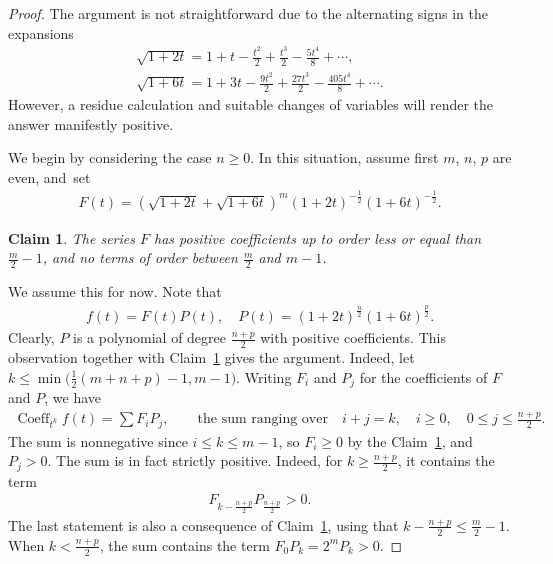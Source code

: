 \documentclass[10pt,a4paper]{amsart}
\numberwithin{equation}{section}
\newtheorem{Claim}[Theorem]{Claim}
\begin{document}
\begin{proof}
The argument is not straightforward due to the alternating signs
in the expansions
\begin{gather*}
\sqrt{1+2t}= 1+t - \frac{t^2}{2}+\frac{t^3}{2}-\frac{5t^4}{8}+\cdots,
\\
\sqrt{1+6t}=1 + 3t - \frac{9t^2}{2}+\frac{27t^3}{2} - \frac{405 t^4}{8} +\cdots.
\end{gather*}
However, a residue calculation and suitable changes of variables will render the answer manifestly positive.

We begin by considering the case $n\geq 0$. In this situation, assume first $m$, $n$, $p$ are even, and~set
\begin{gather*}
F(t)=\left(\sqrt{1+2t}+\sqrt{1+6t}\right)^m {(1+2t)}^{-\frac{1}{2}} (1+6t)^{-\frac{1}{2}}.
\end{gather*}

\begin{Claim}\label{claim}
The series $F$ has positive coefficients up to order less or equal than $\frac{m}{2}-1$, and no terms of order between $\frac{m}{2}$ and $m-1$.
\end{Claim}


We assume this for now. Note that
\begin{gather*}
f(t)=F(t) P(t), \quad P(t)=(1+2t)^{\frac{n}{2}} (1+6t)^{\frac{p}{2}}.
\end{gather*}
Clearly, $P$ is a polynomial of degree $\frac{n+p}{2}$ with positive coefficients. This observation together with Claim~\ref{claim} gives the argument. Indeed, let $k\leq \min\big(\frac{1}{2}(m+n+p)-1, m-1\big)$. Writing $F_i$ and $P_j$ for the coefficients of $F$ and $P$, we have
\begin{gather*}
\operatorname{Coeff}_{ t^k} f(t)=\sum F_iP_j, \qquad\text{the sum ranging over}\quad i+j=k, \quad i\geq 0,\quad 0\leq j\leq \frac{n+p}{2}.
\end{gather*}
The sum is nonnegative since $i\leq k\leq m-1$, so $F_i\geq 0$ by the Claim~\ref{claim}, and $P_j> 0$. The sum is in fact strictly positive. Indeed, for $k\geq \frac{n+p}{2}$, it contains the term
\begin{gather*}
F_{k-\frac{n+p}{2}} P_{\frac{n+p}{2}}>0.
\end{gather*}
The last statement is also a consequence of Claim~\ref{claim}, using that $k-\frac{n+p}{2}\leq\frac{m}{2}-1$. When $k<\frac{n+p}{2}$, the sum contains the term $F_0 P_k=2^m P_k>0$.


\end{proof}
\end{document}
